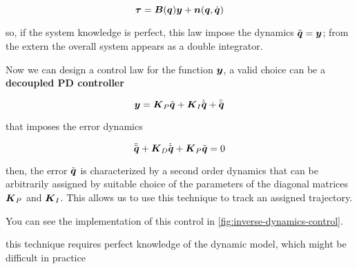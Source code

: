 \[
	\boldsymbol{\tau} = \boldsymbol{B}(\boldsymbol{q})\boldsymbol{y} + \boldsymbol{n}(\boldsymbol{q},\dot{\boldsymbol{q}})
\]

so, if the system knowledge is perfect, this law impose the dynamics $\ddot{\boldsymbol{q}} = \boldsymbol{y}$;
from the extern the overall system appears as a double integrator.

Now we can design a control law for the function $\boldsymbol{y}$, a valid choice can be a \textbf{decoupled PD controller}

\begin{equation}
    \boldsymbol{y} = \boldsymbol{K}_P \tilde{\boldsymbol{q}} + \boldsymbol{K}_I \dot{\tilde{\boldsymbol{q}}} + \ddot{\bar{\boldsymbol{q}}}\label{eq:inverse-dynamics-control-law}
\end{equation}

that imposes the error dynamics

\[
	\ddot{\tilde{\boldsymbol{q}}} + \boldsymbol{K}_D \dot{\tilde{\boldsymbol{q}}} + \boldsymbol{K}_P \tilde{\boldsymbol{q}} = 0
\]

then, the error $\tilde{\boldsymbol{q}}$ is characterized by a second order dynamics that can be arbitrarily assigned by suitable choice of the parameters of the diagonal matrices $\boldsymbol{K}_P$ and $\boldsymbol{K}_I$.
This allows us to use this technique to track an assigned trajectory.

You can see the implementation of this control in \autoref{fig:inverse-dynamics-control}.

\begin{nb}this technique requires perfect knowledge of the dynamic model, which might be difficult in practice\end{nb}

